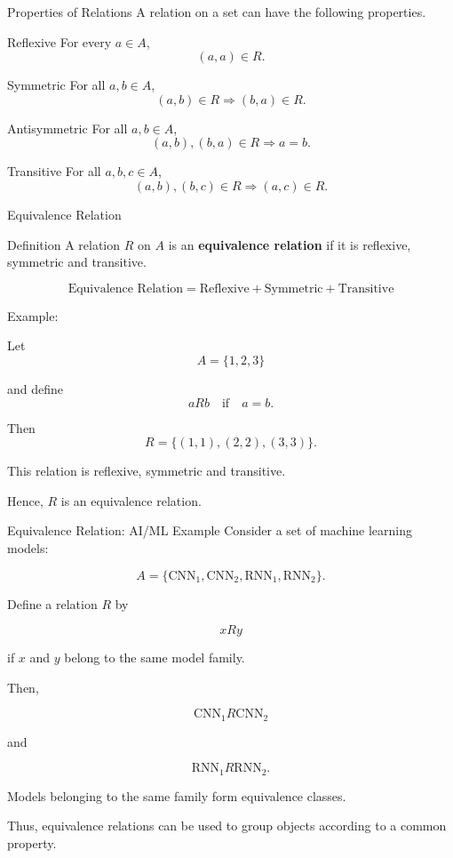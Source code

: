 \documentclass[aspectratio=169]{beamer}
\begin{document}
\begin{frame}{Properties of Relations}
A relation on a set can have the following properties.

\begin{block}{Reflexive}
For every $a\in A$,
\[
(a,a)\in R.
\]
\end{block}

\begin{block}{Symmetric}
For all $a,b\in A$,
\[
(a,b)\in R\Rightarrow(b,a)\in R.
\]
\end{block}

\begin{block}{Antisymmetric}
For all $a,b\in A$,
\[
(a,b),(b,a)\in R\Rightarrow a=b.
\]
\end{block}

\begin{block}{Transitive}
For all $a,b,c\in A$,
\[
(a,b),(b,c)\in R\Rightarrow(a,c)\in R.
\]
\end{block}
\end{frame}

\begin{frame}{Equivalence Relation}
\begin{block}{Definition}
A relation $R$ on $A$ is an \textbf{equivalence relation} if it is reflexive, symmetric and transitive.
\end{block}

\[
\boxed{
\text{Equivalence Relation}
=
\text{Reflexive}+\text{Symmetric}+\text{Transitive}
}
\]

Example:

Let
\[
A=\{1,2,3\}
\]

and define
\[
aRb\quad\text{if}\quad a=b.
\]

Then
\[
R=\{(1,1),(2,2),(3,3)\}.
\]

This relation is reflexive, symmetric and transitive.

Hence, $R$ is an equivalence relation.
\end{frame}

\begin{frame}{Equivalence Relation: AI/ML Example}
Consider a set of machine learning models:

\[
A=\{\text{CNN}_1,\text{CNN}_2,\text{RNN}_1,\text{RNN}_2\}.
\]

Define a relation $R$ by

\[
xRy
\]

if $x$ and $y$ belong to the same model family.

Then,

\[
\text{CNN}_1R\text{CNN}_2
\]

and

\[
\text{RNN}_1R\text{RNN}_2.
\]

Models belonging to the same family form equivalence classes.

Thus, equivalence relations can be used to group objects according to a common property.
\end{frame}
\end{document}
